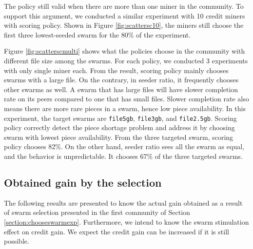 The policy still valid when there are more than one miner in the community. To support this argument, we conducted a similar experiment with 10 credit miners with scoring policy. Shown in Figure \ref{fig:scattersc10}, the miners still choose the first three lowest-seeded swarm for the 80\% of the experiment. 

Figure \ref{fig:scatterscmulti} shows what the policies choose in the community with different file size among the swarms. For each policy, we conducted 3 experiments with only single miner each. From the result, scoring policy mainly chooses swarms with a large file. On the contrary, in seeder ratio, it frequently chooses other swarms as well. A swarm that has large files will have slower completion rate on its peers compared to one that has small files. Slower completion rate also means there are more rare pieces in a swarm, hence low piece availability. In this experiment, the target swarms are \texttt{file5gb}, \texttt{file3gb}, and \texttt{file2.5gb}. Scoring policy correctly detect the piece shortage problem and address it by choosing swarm with lowest piece availability. From the three targeted swarm, scoring policy chooses 82\%. On the other hand, seeder ratio sees all the swarm as equal, and the behavior is unpredictable. It chooses 67\% of the three targeted swarms.

\subsection{Obtained gain by the selection}
\label{section:resultgain}
The following results are presented to know the actual gain obtained as a result of swarm selection presented in the first community of Section \ref{section:chooseswarmexp}. Furthermore, we intend to know the swarm stimulation effect on credit gain. We expect the credit gain can be increased if it is still possible.


